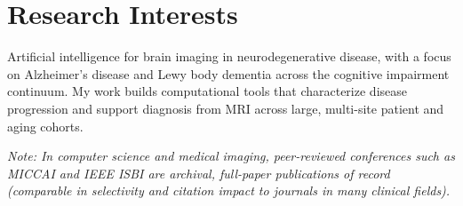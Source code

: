\documentclass[11pt]{article}
\begin{document}


\section{Research Interests}
Artificial intelligence for brain imaging in neurodegenerative disease, with a focus on
Alzheimer's disease and Lewy body dementia across the cognitive impairment continuum.
My work builds computational tools that characterize disease progression and support
diagnosis from MRI across large, multi-site patient and aging cohorts.




{\small\textit{Note: In computer science and medical imaging, peer-reviewed conferences such
as MICCAI and IEEE ISBI are archival, full-paper publications of record (comparable in
selectivity and citation impact to journals in many clinical fields).}}\par
\vspace{4pt}





\end{document}
